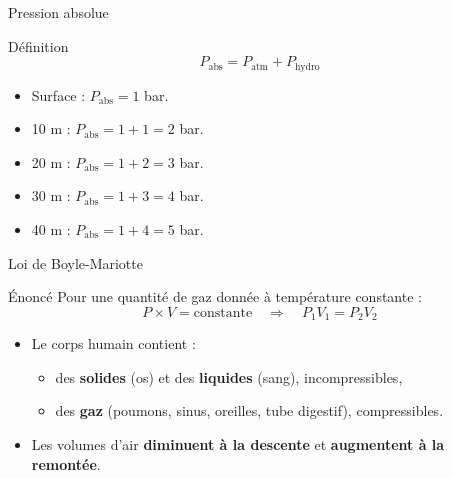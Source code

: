 \begin{frame}{Pression absolue}
  \begin{block}{Définition}
    \[
      P_{\text{abs}} = P_{\text{atm}} + P_{\text{hydro}}
    \]
  \end{block}

  \begin{itemize}
    \item Surface : $P_{\text{abs}} = 1$ bar.
    \item 10 m : $P_{\text{abs}} = 1 + 1 = 2$ bar.
    \item 20 m : $P_{\text{abs}} = 1 + 2 = 3$ bar.
    \item 30 m : $P_{\text{abs}} = 1 + 3 = 4$ bar.
    \item 40 m : $P_{\text{abs}} = 1 + 4 = 5$ bar.
  \end{itemize}
\end{frame}

\begin{frame}{Loi de Boyle-Mariotte}
  \begin{block}{Énoncé}
    Pour une quantité de gaz donnée à température constante :
    \[
      P \times V = \text{constante} \quad \Rightarrow \quad P_1 V_1 = P_2 V_2
    \]
  \end{block}

  \begin{itemize}
    \item Le corps humain contient :
          \begin{itemize}
            \item des \textbf{solides} (os) et des \textbf{liquides} (sang), \alert{incompressibles},
            \item des \textbf{gaz} (poumons, sinus, oreilles, tube digestif), \alert{compressibles}.
          \end{itemize}
    \item Les volumes d’air \textbf{diminuent à la descente} et \textbf{augmentent à la remontée}.
  \end{itemize}
\end{frame}

